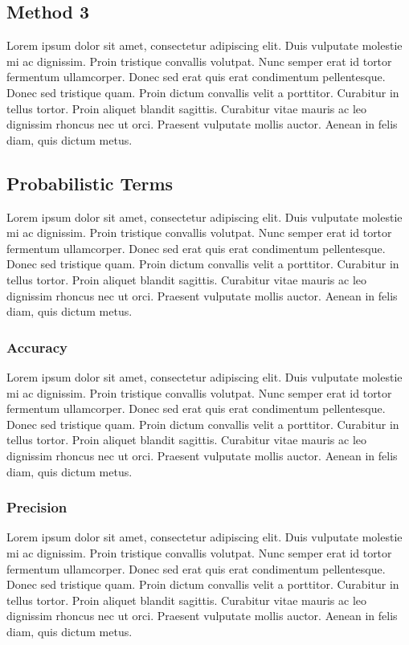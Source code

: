 \documentclass[11pt]{article}
\begin{document}
\subsection{Method 3}
Lorem ipsum dolor sit amet, consectetur adipiscing elit. Duis vulputate molestie mi ac dignissim. Proin tristique convallis volutpat. Nunc semper erat id tortor fermentum ullamcorper. Donec sed erat quis erat condimentum pellentesque. Donec sed tristique quam. Proin dictum convallis velit a porttitor. Curabitur in tellus tortor. Proin aliquet blandit sagittis. Curabitur vitae mauris ac leo dignissim rhoncus nec ut orci. Praesent vulputate mollis auctor. Aenean in felis diam, quis dictum metus.

\subsection{Probabilistic Terms}
Lorem ipsum dolor sit amet, consectetur adipiscing elit. Duis vulputate molestie mi ac dignissim. Proin tristique convallis volutpat. Nunc semper erat id tortor fermentum ullamcorper. Donec sed erat quis erat condimentum pellentesque. Donec sed tristique quam. Proin dictum convallis velit a porttitor. Curabitur in tellus tortor. Proin aliquet blandit sagittis. Curabitur vitae mauris ac leo dignissim rhoncus nec ut orci. Praesent vulputate mollis auctor. Aenean in felis diam, quis dictum metus.

\subsubsection{Accuracy}
Lorem ipsum dolor sit amet, consectetur adipiscing elit. Duis vulputate molestie mi ac dignissim. Proin tristique convallis volutpat. Nunc semper erat id tortor fermentum ullamcorper. Donec sed erat quis erat condimentum pellentesque. Donec sed tristique quam. Proin dictum convallis velit a porttitor. Curabitur in tellus tortor. Proin aliquet blandit sagittis. Curabitur vitae mauris ac leo dignissim rhoncus nec ut orci. Praesent vulputate mollis auctor. Aenean in felis diam, quis dictum metus.

\subsubsection{Precision}
Lorem ipsum dolor sit amet, consectetur adipiscing elit. Duis vulputate molestie mi ac dignissim. Proin tristique convallis volutpat. Nunc semper erat id tortor fermentum ullamcorper. Donec sed erat quis erat condimentum pellentesque. Donec sed tristique quam. Proin dictum convallis velit a porttitor. Curabitur in tellus tortor. Proin aliquet blandit sagittis. Curabitur vitae mauris ac leo dignissim rhoncus nec ut orci. Praesent vulputate mollis auctor. Aenean in felis diam, quis dictum metus.
\end{document}
